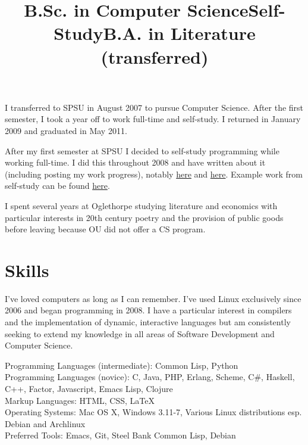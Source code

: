 \documentclass[margintitle,line]{res}
\begin{document}
\begin{resume}
\title{B.Sc. in Computer Science}
\begin{position}
  I transferred to SPSU in August 2007 to pursue Computer Science.
  After the first semester, I took a year off to work full-time and self-study.
  I returned in January 2009 and graduated in May 2011.
\end{position}

\title{Self-Study}
\begin{position}
  After my first semester at SPSU I decided to self-study
  programming while working full-time. I did this
  throughout 2008 and have written about it
  (including posting my work progress), notably
  \href{http://blog.redlinernotes.com/posts/Leaving-College-to-Leverage-Compulsion.html}{here} and
  \href{http://blog.redlinernotes.com/posts/Spring-2008-Schedule-and-Syllabus.html}{here}.
  Example work from self-study can be found
  \href{http://blog.redlinernotes.com/posts/SICP-Section-1.3.html}{here}.
\end{position}

\title{B.A. in Literature (transferred)}
\begin{position}
  I spent several years at Oglethorpe studying literature
  and economics with particular interests in 20th century
  poetry and the provision of public goods before leaving
  because OU did not offer a CS program.
\end{position}


\setlength{\parskip}{1ex}


\section{Skills}

I've loved computers as long as I can remember. I've used Linux exclusively
since 2006 and began programming in 2008. I have a particular interest in
compilers and the implementation of dynamic, interactive languages but am
consistently seeking to extend my knowledge in all areas of Software Development
and Computer Science.

Programming Languages (intermediate): Common Lisp, Python \\
Programming Languages (novice): C, Java, PHP, Erlang, Scheme, C\#, Haskell,
C++, Factor, Javascript, Emacs Lisp, Clojure \\
Markup Languages: HTML, CSS, LaTeX \\
Operating Systems: Mac OS X, Windows 3.11-7, Various Linux distributions
esp. Debian and Archlinux \\
Preferred Tools: Emacs, Git, Steel Bank Common Lisp, Debian \\


\end{resume}
\end{document}
